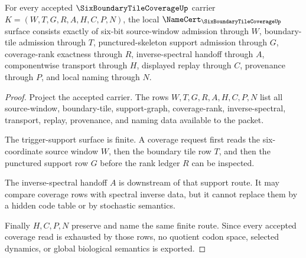 \begin{theorem}
\label{thm:six-boundary-tile-coverage-obligations}
For every accepted $\SixBoundaryTileCoverageUp$ carrier $K=(W,T,G,R,A,H,C,P,N)$, the local $\NameCert_{\SixBoundaryTileCoverageUp}$ surface consists exactly of six-bit source-window admission through $W$, boundary-tile admission through $T$, punctured-skeleton support admission through $G$, coverage-rank exactness through $R$, inverse-spectral handoff through $A$, componentwise transport through $H$, displayed replay through $C$, provenance through $P$, and local naming through $N$.
\end{theorem}
\begin{proof}
Project the accepted carrier. The rows $W,T,G,R,A,H,C,P,N$ list all source-window, boundary-tile, support-graph, coverage-rank, inverse-spectral, transport, replay, provenance, and naming data available to the packet.

The trigger-support surface is finite. A coverage request first reads the six-coordinate source window $W$, then the boundary tile row $T$, and then the punctured support row $G$ before the rank ledger $R$ can be inspected.

The inverse-spectral handoff $A$ is downstream of that support route. It may compare coverage rows with spectral inverse data, but it cannot replace them by a hidden code table or by stochastic semantics.

Finally $H,C,P,N$ preserve and name the same finite route. Since every accepted coverage read is exhausted by those rows, no quotient codon space, selected dynamics, or global biological semantics is exported.
\end{proof}

